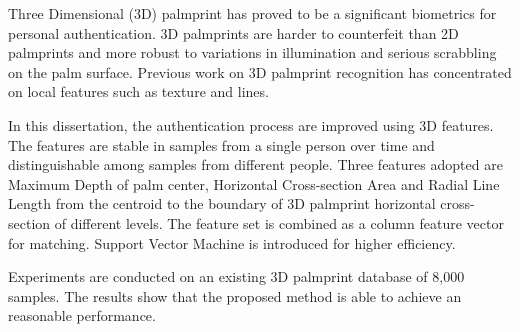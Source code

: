 
Three Dimensional (3D) palmprint has proved to be a significant biometrics for personal authentication. 3D palmprints are harder to counterfeit than 2D palmprints and more robust to variations in illumination and serious scrabbling on the palm surface. Previous work on 3D palmprint recognition has concentrated on local features such as texture and lines.

\vspace{12pt}

In this dissertation, the authentication process are improved using 3D features. The features are stable in samples from a single person over time and distinguishable among samples from different people. Three features adopted are Maximum Depth of palm center, Horizontal Cross-section Area and Radial Line Length from the centroid to the boundary of 3D palmprint horizontal cross-section of different levels. The feature set is combined as a column feature vector for matching. Support Vector Machine is introduced for higher efficiency.

\vspace{12pt}

Experiments are conducted on an existing 3D palmprint database of 8,000 samples. The results show that the proposed method is able to achieve an reasonable performance.


